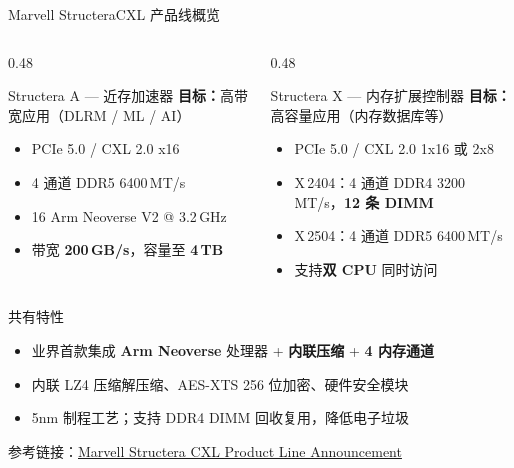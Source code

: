 \documentclass[UTF8,9pt,aspectratio=169]{beamer}
\begin{document}
\begin{frame}{Marvell Structera}{CXL 产品线概览}
    \vspace{-0.3cm}
    \begin{columns}[T]
        \begin{column}{0.48\textwidth}
            \begin{block}{Structera A --- 近存加速器}
                \small
                \textbf{目标：}高带宽应用（DLRM / ML / AI）
                \begin{itemize}
                    \item PCIe 5.0 / CXL 2.0 x16
                    \item 4 通道 DDR5 6400\,MT/s
                    \item 16 \texttimes Arm Neoverse V2 @ 3.2\,GHz
                    \item 带宽 \textbf{200\,GB/s}，容量至 \textbf{4\,TB}
                \end{itemize}
            \end{block}
        \end{column}
        \begin{column}{0.48\textwidth}
            \begin{block}{Structera X --- 内存扩展控制器}
                \small
                \textbf{目标：}高容量应用（内存数据库等）
                \begin{itemize}
                    \item PCIe 5.0 / CXL 2.0 1x16 或 2x8
                    \item X\,2404：4 通道 DDR4 3200\,MT/s，\textbf{12 条 DIMM}
                    \item X\,2504：4 通道 DDR5 6400\,MT/s
                    \item 支持\textbf{双 CPU} 同时访问
                \end{itemize}
            \end{block}
        \end{column}
    \end{columns}

    \begin{block}{共有特性}
        \small
        \begin{itemize}
            \item 业界首款集成 \textbf{Arm Neoverse} 处理器 + \textbf{内联压缩} + \textbf{4 内存通道}
            \item 内联 LZ4 压缩解压缩、AES-XTS 256 位加密、硬件安全模块
            \item 5nm 制程工艺；支持 DDR4 DIMM 回收复用，降低电子垃圾
        \end{itemize}
    \end{block}

    \vspace{0.1cm}
    {\footnotesize 参考链接：\href{https://cn.marvell.com/company/newsroom/marvell-introduces-breakthrough-structera-cxl-product-line-to-address-server-memory-bandwidth-and-capacity-challenges-in-cloud-data-centers.html}{Marvell Structera CXL Product Line Announcement}}
\end{frame}
\end{document}
